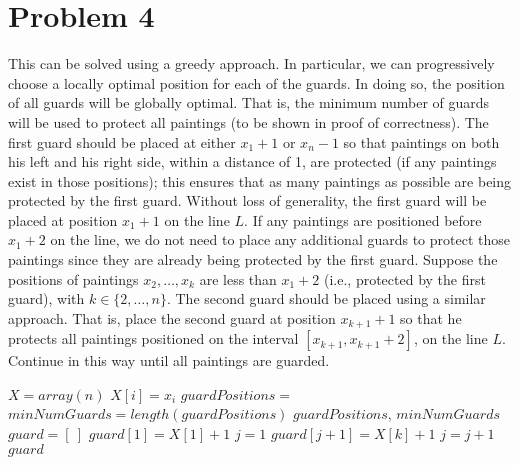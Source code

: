\documentclass[twoside,11pt]{homework}
\newcommand\NoProc{\renewcommand\algorithmicprocedure{}}
\begin{document}
\section*{Problem 4}
This can be solved using a greedy approach.  In particular, we can progressively choose a locally optimal position for each of the guards.  In doing so,  the position of all guards will be globally optimal.  That is,  the minimum number of guards will be used to protect all paintings (to be shown in proof of correctness).    The first guard should be placed at either $x_1 + 1$ or $x_n - 1$ so that paintings on both his left and his right side,  within a distance of 1, are protected (if any paintings exist in those positions); this ensures that as many paintings as possible are being protected by the first guard.  Without loss of generality,  the first guard will be placed at position $x_1 + 1$ on the line $L$.  If any paintings are positioned before $x_1 + 2$ on the line,  we do not need to place any additional guards to protect those paintings since they are already being protected by the first guard.  Suppose the positions of paintings $x_2, \dots , x_k$ are less than $x_1 + 2$ (i.e.,  protected by the first guard), with $k \in \{2, \dots, n\}$.  The second guard should be placed using a similar approach.  That is, place the second guard at position $x_{k+1} +1$ so that he protects all paintings positioned on the interval $[x_{k+1},  x_{k+1} +2]$, on the line $L$.  Continue in this way until all paintings are guarded. \\

\begin{algorithm}
\begin{algorithmic}[1]
\NoProc
{}    %
\State $X = array(n)$
\State $X[i] = x_i$
\EndFor
\State $guardPositions = $  
\State $minNumGuards = length(guardPositions)$
\State \Return $guardPositions$,  $minNumGuards$   
\EndProcedure \\


\State $guard = [ \ ]$   
\State $guard[1] = X[1] + 1$
\State $j = 1$    
\State $guard[j+1] = X[k]+1$    
\State $j = j+1$  
\EndIf
\EndFor
\State \Return $guard$   
\EndProcedure
\end{algorithmic}
\end{algorithm}
\end{document}
